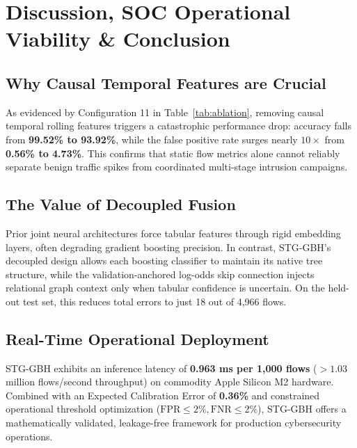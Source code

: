 \documentclass[11pt,a4paper]{article}
\begin{document}
\section{Discussion, SOC Operational Viability \& Conclusion}
\label{sec:conclusion}

\subsection{Why Causal Temporal Features are Crucial}
As evidenced by Configuration 11 in Table~\ref{tab:ablation}, removing causal temporal rolling features triggers a catastrophic performance drop: accuracy falls from \textbf{99.52\% to 93.92\%}, while the false positive rate surges nearly $10\times$ from \textbf{0.56\% to 4.73\%}. This confirms that static flow metrics alone cannot reliably separate benign traffic spikes from coordinated multi-stage intrusion campaigns.

\subsection{The Value of Decoupled Fusion}
Prior joint neural architectures force tabular features through rigid embedding layers, often degrading gradient boosting precision. In contrast, STG-GBH's decoupled design allows each boosting classifier to maintain its native tree structure, while the validation-anchored log-odds skip connection injects relational graph context only when tabular confidence is uncertain. On the held-out test set, this reduces total errors to just 18 out of 4,966 flows.

\subsection{Real-Time Operational Deployment}
STG-GBH exhibits an inference latency of \textbf{0.963 ms per 1,000 flows} ($>1.03$ million flows/second throughput) on commodity Apple Silicon M2 hardware. Combined with an Expected Calibration Error of \textbf{0.36\%} and constrained operational threshold optimization ($\text{FPR} \le 2\%, \text{FNR} \le 2\%$), STG-GBH offers a mathematically validated, leakage-free framework for production cybersecurity operations.
\end{document}
